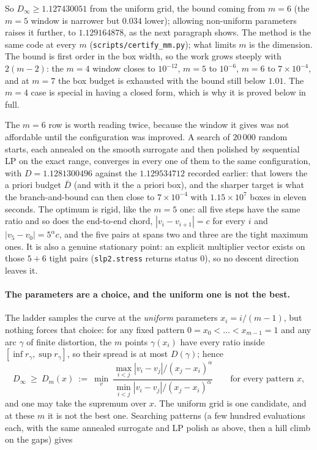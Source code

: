 \documentclass[11pt]{article}
\theoremstyle{remark}
\newcommand{\alp}{\alpha}
\begin{document}
So $D_\infty\ge1.127430051$ from the uniform grid, the bound coming from $m=6$ (the $m=5$ window is
narrower but $0.034$ lower); allowing non-uniform parameters raises it further, to
$1.129164878$, as the next paragraph shows.
The method is the same code at every $m$ (\texttt{scripts/certify\_mm.py}); what limits $m$ is the
dimension. The bound is first order in the box width, so the work grows steeply with $2(m-2)$: the
$m=4$ window closes to $10^{-12}$, $m=5$ to $10^{-6}$, $m=6$ to $7\times10^{-4}$, and at $m=7$ the
box budget is exhausted with the bound still below $1.01$. The $m=4$ case is special in having a
closed form, which is why it is proved below in full.

The $m=6$ row is worth reading twice, because the window it gives was not affordable until the
configuration was improved. A search of $20\,000$ random starts, each annealed on the smooth
surrogate and then polished by sequential LP on the exact range, converges in every one of them to
the same configuration, with $D=1.1281300496$ against the $1.129534712$ recorded earlier: that
lowers the a priori budget $\bar D$ (and with it the a priori box), and the sharper target is what
the branch-and-bound can then close to $7\times10^{-4}$ with $1.15\times10^{7}$ boxes in eleven seconds. The optimum is
rigid, like the $m=5$ one: all five steps have the same ratio and so does the
end-to-end chord, $|v_i-v_{i+1}|=c$ for every $i$ and $|v_5-v_0|=5^{\alp}c$, and the five pairs at
spans two and three are the tight maximum ones. It is also a genuine stationary point: an explicit
multiplier vector exists on those $5+6$ tight pairs (\texttt{slp2.stress} returns status $0$), so
no descent direction leaves it.

\paragraph{The parameters are a choice, and the uniform one is not the best.} The ladder samples
the curve at the \emph{uniform} parameters $x_i=i/(m-1)$, but nothing forces that choice: for any
fixed pattern $0=x_0<\dots<x_{m-1}=1$ and any arc $\gamma$ of finite distortion, the $m$ points
$\gamma(x_i)$ have every ratio inside $[\inf r_\gamma,\sup r_\gamma]$, so their spread is at most
$D(\gamma)$; hence
\begin{equation}\label{eq:pattern}
  D_\infty\ \ge\ D_m(x)\ :=\ \min_{v}\ \frac{\max_{i<j}|v_i-v_j|/(x_j-x_i)^{\alp}}
                                          {\min_{i<j}|v_i-v_j|/(x_j-x_i)^{\alp}}
  \qquad\text{for every pattern }x,
\end{equation}
and one may take the supremum over $x$. The uniform grid is one candidate, and at these $m$ it is
not the best one. Searching patterns (a few hundred evaluations each, with the same annealed
surrogate and LP polish as above, then a hill climb on the gaps) gives
\end{document}
